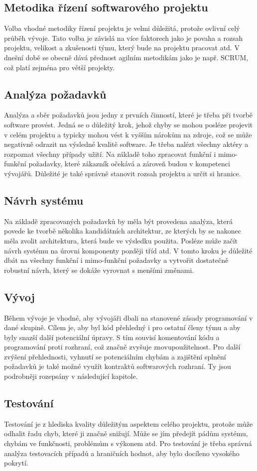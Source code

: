 	\subsection{Metodika řízení softwarového projektu}
		Volba vhodné metodiky řízení projektu je velmi důležitá, protože ovlivní celý průběh vývoje. Tato volba je závislá na více faktorech jako je povaha a rozsah projektu, velikost a zkušenosti týmu, který bude na projektu pracovat atd. V dnešní době se obecně dává přednost agilním metodikám jako je např. SCRUM, což platí zejména pro větší projekty.
	
	\subsection{Analýza požadavků}
		Analýza a sběr požadavků jsou jedny z prvních činností, které je třeba při tvorbě software provést. Jedná se o důležitý krok, jehož chyby se mohou posléze projevit v celém projektu a typicky mohou vést k vyšším nárokům na zdroje, což se může negativně odrazit na výsledné kvalitě software. Je třeba nalézt všechny aktéry a rozpoznat všechny případy užití. Na základě toho zpracovat funkční i mimo-funkční požadavky, které zákazník očekává a zároveň budou v kompetenci vývojářů. Důležité je také správně stanovit rozsah projektu a určit si hranice. 

	\subsection{Návrh systému}
		Na základě zpracovaných požadavků by měla být provedena analýza, která povede ke tvorbě několika kandidátních architektur, ze kterých by se nakonec měla zvolit architektura, která bude ve výsledku použita. Posléze může začít návrh systému na úrovni komponenty později tříd atd. V tomto kroku je důležité dbát na všechny funkční i mimo-funkční požadavky a vytvořit dostatečně robustní návrh, který se dokáže vyrovnat s menšími změnami.
		
	\subsection{Vývoj}
		Během vývoje je vhodné, aby vývojáři dbali na stanovené zásady programování v dané skupině. Cílem je, aby byl kód přehledný i pro ostatní členy týmu a aby byly snazší další potenciální úpravy. S tím souvisí komentování kódu a programování proti rozhraní, což značně zvyšuje znovupoužitelnost. Pro další zvýšení přehlednosti, vyhnutí se potenciálním chybám a zajištění splnění požadavků je také možné využít kontraktů softwarových rozhraní. Ty jsou podrobněji rozepsány v následující kapitole.
	
	\subsection{Testování}
		Testování je z hlediska kvality důležitým aspektem celého projektu, protože může odhalit řadu chyb, které ji značně snižují. Může se jím předejít pádům systému, chybám ve funkčnosti, problémům s výkonem atd. Pro testování je třeba správná analýza testovacích případů a hraničních hodnot, aby bylo docíleno vysokého pokrytí.
	
	
